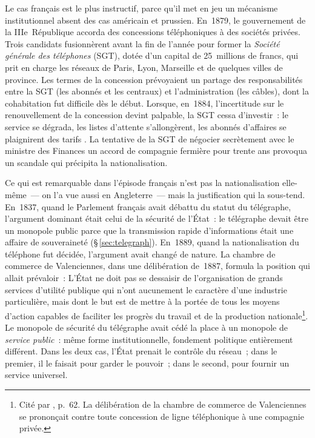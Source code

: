Le cas français est le plus instructif, parce qu'il met en jeu un mécanisme institutionnel absent des cas américain et prussien. En~1879, le gouvernement de la IIIe~République accorda des concessions téléphoniques à des sociétés privées. Trois candidats fusionnèrent avant la fin de l'année pour former la \emph{Société générale des téléphones} (SGT), dotée d'un capital de 25~millions de francs, qui prit en charge les réseaux de Paris, Lyon, Marseille et de quelques villes de province. Les termes de la concession prévoyaient un partage des responsabilités entre la SGT (les abonnés et les centraux) et l'administration (les câbles), dont la cohabitation fut difficile dès le début. Lorsque, en~1884, l'incertitude sur le renouvellement de la concession devint palpable, la SGT cessa d'investir~: le service se dégrada, les listes d'attente s'allongèrent, les abonnés d'affaires se plaignirent des tarifs \parencite{bertho_histoire_1984}. La tentative de la SGT de négocier secrètement avec le ministre des Finances un accord de \og compagnie fermière\fg{} pour trente ans provoqua un scandale qui précipita la nationalisation.

%
Ce qui est remarquable dans l'épisode français n'est pas la nationalisation elle-même~--- on l'a vue aussi en Angleterre~--- mais la justification qui la sous-tend. En~1837, quand le Parlement français avait débattu du statut du télégraphe, l'argument dominant était celui de la sécurité de l'État~: le télégraphe devait être un monopole public parce que la transmission rapide d'informations était une affaire de souveraineté (§\,\ref{sec:telegraph}). En~1889, quand la nationalisation du téléphone fut décidée, l'argument avait changé de nature. La chambre de commerce de Valenciennes, dans une délibération de~1887, formula la position qui allait prévaloir~: \og L'État ne doit pas se dessaisir de l'organisation de grands services d'utilité publique qui n'ont aucunement le caractère d'une industrie particulière, mais dont le but est de mettre à la portée de tous les moyens d'action capables de faciliter les progrès du travail et de la production nationale\fg{}\footnote{Cité par \textcite{bertho_histoire_1984}, p.~62. La délibération de la chambre de commerce de Valenciennes se prononçait \og contre toute concession de ligne téléphonique à une compagnie privée\fg{}.}. Le monopole de sécurité du télégraphe avait cédé la place à un monopole de \emph{service public}~: même forme institutionnelle, fondement politique entièrement différent. Dans les deux cas, l'État prenait le contrôle du réseau~; dans le premier, il le faisait pour garder le pouvoir~; dans le second, pour fournir un service universel.

